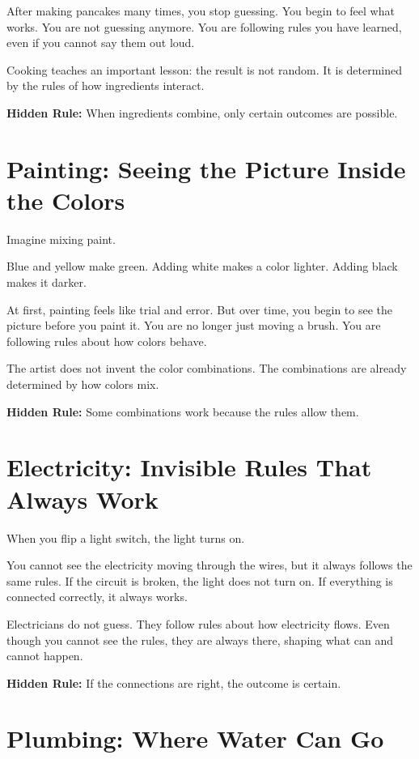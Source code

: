 \documentclass[12pt]{book}
\begin{document}
After making pancakes many times, you stop guessing. You begin to feel
what works. You are not guessing anymore. You are following rules you have
learned, even if you cannot say them out loud.

Cooking teaches an important lesson: the result is not random. It is
determined by the rules of how ingredients interact.

\textbf{Hidden Rule:} When ingredients combine, only certain outcomes are
possible.

\section{Painting: Seeing the Picture Inside the Colors}

Imagine mixing paint.

Blue and yellow make green. Adding white makes a color lighter. Adding
black makes it darker.

At first, painting feels like trial and error. But over time, you begin
to see the picture before you paint it. You are no longer just moving a
brush. You are following rules about how colors behave.

The artist does not invent the color combinations. The combinations are
already determined by how colors mix.

\textbf{Hidden Rule:} Some combinations work because the rules allow them.

\section{Electricity: Invisible Rules That Always Work}

When you flip a light switch, the light turns on.

You cannot see the electricity moving through the wires, but it always
follows the same rules. If the circuit is broken, the light does not turn
on. If everything is connected correctly, it always works.

Electricians do not guess. They follow rules about how electricity flows.
Even though you cannot see the rules, they are always there, shaping what
can and cannot happen.

\textbf{Hidden Rule:} If the connections are right, the outcome is certain.

\section{Plumbing: Where Water Can Go}
\end{document}
